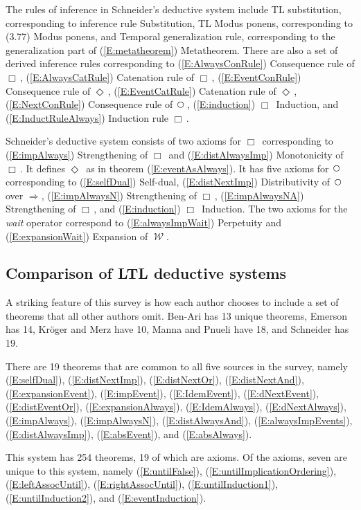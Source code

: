 \documentclass[12pt, fleqn, leqno]{article}
\newcommand{\impl}{\ensuremath{\Rightarrow}}        %
\newcommand{\Wait}{\;\mathcal{W}\;}
\newcommand{\Next}{\;\,\text{\raisebox{3.5pt}{\circle{6}}}}
\newcommand{\Event}{\Diamond\,}
\newcommand{\Always}{\Box\,}
\begin{document}
The rules of inference in Schneider's deductive system include TL substitution, corresponding to inference rule Substitution, TL Modus ponens, corresponding to (3.77) Modus ponens, and Temporal generalization rule, corresponding to the generalization part of (\ref{E:metatheorem}) Metatheorem.
There are also a set of derived inference rules corresponding to (\ref{E:AlwaysConRule}) Consequence rule of $\Always$, (\ref{E:AlwaysCatRule}) Catenation rule of $\Always$, (\ref{E:EventConRule}) Consequence rule of $\Event$, (\ref{E:EventCatRule}) Catenation rule of $\Event$, (\ref{E:NextConRule}) Consequence rule of $\Next$, (\ref{E:induction}) $\Always$ Induction, and (\ref{E:InductRuleAlways}) Induction rule $\Always$.

Schneider's deductive system consists of two axioms for $\Always$ corresponding to (\ref{E:impAlways}) Strengthening of $\Always$ and (\ref{E:distAlwaysImp}) Monotonicity of $\Always$.
It defines $\Event$ as in theorem (\ref{E:eventAsAlways}).
It has five axioms for $\Next$ corresponding to (\ref{E:selfDual}) Self-dual, (\ref{E:distNextImp}) Distributivity of $\Next$ over $\impl$, (\ref{E:impAlwaysN}) Strengthening of $\Always$, (\ref{E:impAlwaysNA}) Strengthening of $\Always$, and (\ref{E:induction}) $\Always$ Induction.
The two axioms for the \textit{wait} operator correspond to (\ref{E:alwaysImpWait}) Perpetuity and (\ref{E:expansionWait}) Expansion of $\Wait$.

\subsection{Comparison of LTL deductive systems}\label{section-comparison}

A striking feature of this survey is how each author chooses to include a set of theorems that all other authors omit.
Ben-Ari has 13 unique theorems, Emerson has 14, Kröger and Merz have 10, Manna and Pnueli have 18, and Schneider has 19.

There are 19 theorems that are common to all five sources in the survey, namely
(\ref{E:selfDual}),
(\ref{E:distNextImp}),
(\ref{E:distNextOr}),
(\ref{E:distNextAnd}),
(\ref{E:expansionEvent}),
(\ref{E:impEvent}),
(\ref{E:IdemEvent}),
(\ref{E:dNextEvent}),
(\ref{E:distEventOr}),
(\ref{E:expansionAlways}),
(\ref{E:IdemAlways}),
(\ref{E:dNextAlways}),
(\ref{E:impAlways}),
(\ref{E:impAlwaysN}),
(\ref{E:distAlwaysAnd}),
(\ref{E:alwaysImpEvents}),
(\ref{E:distAlwaysImp}),
(\ref{E:absEvent}), and
(\ref{E:absAlways}).

This system has 254 theorems, 19 of which are axioms.
Of the axioms, seven are unique to this system, namely
(\ref{E:untilFalse}),
(\ref{E:untilImplicationOrdering}),
(\ref{E:leftAssocUntil}),
(\ref{E:rightAssocUntil}),
(\ref{E:untilInduction1}),
(\ref{E:untilInduction2}), and
(\ref{E:eventInduction}).
\end{document}
